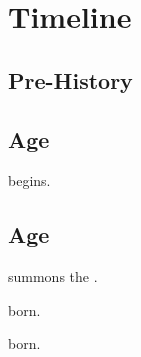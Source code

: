 \chapter{Timeline}















\section{Pre-History}















\section{\Ophidian{} Age}
\begin{timeline}
  
  \Firstbanewar{} begins. 
 
\end{timeline}
















\section{\Saphyraean{} Age}
\begin{timeline}

  \Tiamat{} summons the \xzaishann. 
  
   born. 
  
   born. 
 
\end{timeline}
















